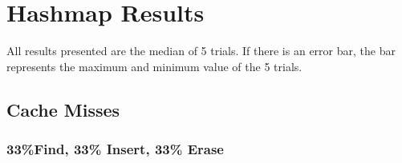 \chapter{Hashmap Results}
\label{app:hashmaps}

All results presented are the median of 5 trials. If there is an error bar, the bar represents the maximum and minimum value of the 5 trials.

\iffalse
\section{Cache Misses}

\subsection{33\%Find, 33\% Insert, 33\% Erase}

